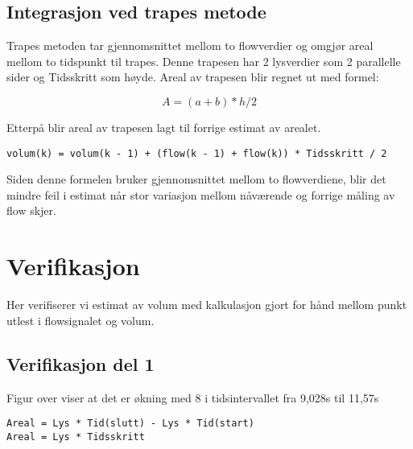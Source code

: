 \subsection{Integrasjon ved trapes metode}

\begin{figure}[H]
\centering
\end{figure}

Trapes metoden tar gjennomsnittet mellom to flowverdier og omgjør areal mellom to tidspunkt til trapes. Denne trapesen har 2 lysverdier som 2 parallelle sider og Tidsskritt som høyde.
Areal av trapesen blir regnet ut med formel:

\begin{equation}
A = (a + b) * h/ 2   
\end{equation}

Etterpå blir areal av trapesen lagt til forrige estimat av arealet. 

\begin{lstlisting}
volum(k) = volum(k - 1) + (flow(k - 1) + flow(k)) * Tidsskritt / 2  
\end{lstlisting}

Siden denne formelen bruker gjennomsnittet mellom to flowverdiene, blir det mindre feil i estimat når stor variasjon mellom nåværende og forrige måling av flow skjer.

\section{Verifikasjon}

Her verifiserer vi estimat av volum med kalkulasjon gjort for hånd mellom punkt utlest i flowsignalet og volum.

\subsection{Verifikasjon del 1}

\begin{figure}[H]
\centering
\end{figure}

Figur over viser at det er økning med 8 i tidsintervallet fra 9,028s til 11,57s

\begin{lstlisting}
Areal = Lys * Tid(slutt) - Lys * Tid(start)
Areal = Lys * Tidsskritt
\end{lstlisting}

